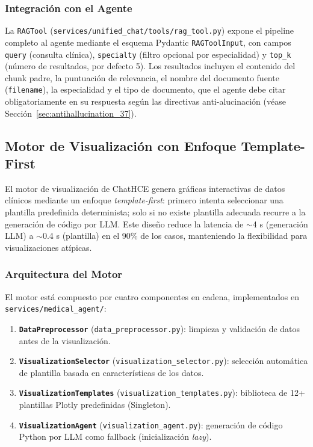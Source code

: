 \subsubsection{Integración con el Agente}

La \texttt{RAGTool} (\texttt{services/unified\_chat/tools/rag\_tool.py}) expone el pipeline completo al agente mediante el esquema Pydantic \texttt{RAGToolInput}, con campos \texttt{query} (consulta clínica), \texttt{specialty} (filtro opcional por especialidad) y \texttt{top\_k} (número de resultados, por defecto 5). Los resultados incluyen el contenido del chunk padre, la puntuación de relevancia, el nombre del documento fuente (\texttt{filename}), la especialidad y el tipo de documento, que el agente debe citar obligatoriamente en su respuesta según las directivas anti-alucinación (véase Sección~\ref{sec:antihallucination_37}).


\subsection{Motor de Visualización con Enfoque Template-First}
\label{sec:motor_visualizacion}

El motor de visualización de ChatHCE genera gráficas interactivas de datos clínicos mediante un enfoque \textit{template-first}: primero intenta seleccionar una plantilla predefinida determinista; solo si no existe plantilla adecuada recurre a la generación de código por LLM. Este diseño reduce la latencia de $\sim$4 s (generación LLM) a $\sim$0.4 s (plantilla) en el 90\% de los casos, manteniendo la flexibilidad para visualizaciones atípicas.

\subsubsection{Arquitectura del Motor}

El motor está compuesto por cuatro componentes en cadena, implementados en \texttt{services/medical\_agent/}:

\begin{enumerate}[nosep, leftmargin=*]
  \item \textbf{\texttt{DataPreprocessor}} (\texttt{data\_preprocessor.py}): limpieza y validación de datos antes de la visualización.
  \item \textbf{\texttt{VisualizationSelector}} (\texttt{visualization\_selector.py}): selección automática de plantilla basada en características de los datos.
  \item \textbf{\texttt{VisualizationTemplates}} (\texttt{visualization\_templates.py}): biblioteca de 12+ plantillas Plotly predefinidas (Singleton).
  \item \textbf{\texttt{VisualizationAgent}} (\texttt{visualization\_agent.py}): generación de código Python por LLM como fallback (inicialización \textit{lazy}).
\end{enumerate}


